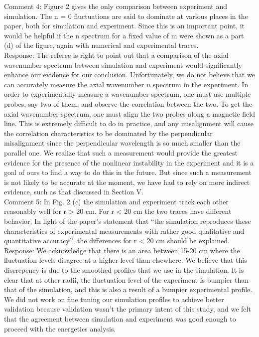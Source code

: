 \documentclass[12pt]{article}
\begin{document}
Comment 4:   Figure 2 gives the only comparison between experiment and simulation. The n = 0
fluctuations are said to dominate at various places in the paper, both for simulation and
experiment. Since this is an important point, it would be helpful if the n spectrum for a
fixed value of m were shown as a part (d) of the figure, again with numerical and
experimental traces. \\

Response: The referee is right to point out that a comparison of the axial wavenumber spectrum between simulation and experiment would significantly enhance our evidence for our conclusion.
Unfortunately, we do not believe that we can accurately measure the axial wavenumber $n$ spectrum in the experiment. In order to experimentally measure a wavenumber spectrum, one must
use multiple probes, say two of them, and observe the correlation between the two. To get the axial wavenumber spectrum, one must align the two probes along a magnetic field line.
This is extremely difficult to do in practice, and any misalignment will cause the correlation characteristics to be dominated by the perpendicular misalignment since the perpendicular
wavelength is so much smaller than the parallel one. We realize that such a measurement would provide the greatest
evidence for the presence of the nonlinear instability in the experiment and it is a goal of ours to find a way to do this in the future. 
But since such a measurement is not likely to be accurate at the moment, we have had to rely on more indirect evidence, such as that discussed in Section V. \\
   

Comment 5: In Fig. 2 (c) the simulation and experiment track each other reasonably well for r > 20
cm. For r < 20 cm the two traces have different behavior. In light of the paper’s
statement that “the simulation reproduces these characteristics of experimental
measurements with rather good qualitative and quantitative accuracy”, the differences for
r < 20 cm should be explained. \\

Response: We acknowledge that there is an area between 15-20 cm where the fluctuation levels disagree at a higher level than elsewhere. We believe that this discrepency is due to the smoothed
profiles that we use in the simulation. It is clear that at other radii, the fluctuation level of the experiment is bumpier than that of the simulation, and this is also a result
of a bumpier experimental profile. We did not work on fine tuning our simulation profiles to achieve better validation because validation wasn't the primary intent of this study,
and we felt that the agreement between simulation and experiment was good enough to proceed with the energetics analysis. \\
\end{document}
